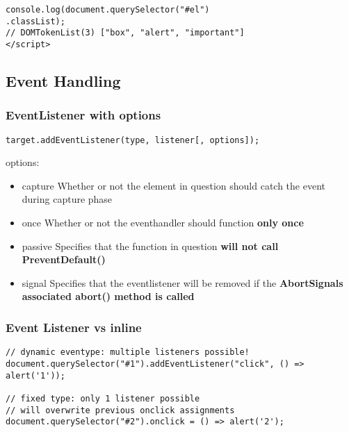 \documentclass[main.tex,fontsize=6pt,paper=a4,paper=landscape,DIV=calc,]{scrartcl}
\begin{document}
\begin{multicols*}{4}
\begin{lstlisting}
console.log(document.querySelector("#el")
.classList);
// DOMTokenList(3) ["box", "alert", "important"]
</script>
\end{lstlisting}
\vspace{2mm}


\subsection{Event Handling}

\subsubsection{EventListener with options}  
\vspace{-2mm}
\begin{lstlisting}
target.addEventListener(type, listener[, options]);
\end{lstlisting}
\vspace{2mm}
options:
\begin{itemize}
  \item capture \newline
    Whether or not the element in question should catch the event during capture phase
  \item once \newline
    Whether or not the eventhandler should function \textbf{only once}
  \item passive \newline
    Specifies that the function in question \textbf{will not call PreventDefault()}
  \item signal \newline 
    Specifies that the eventlistener will be removed if the \textbf{AbortSignals associated abort() method is called}
  
\end{itemize}

\subsubsection{Event Listener vs inline}  
\vspace{-2mm}
\begin{lstlisting}
// dynamic eventype: multiple listeners possible!
document.querySelector("#1").addEventListener("click", () => alert('1'));

// fixed type: only 1 listener possible
// will overwrite previous onclick assignments
document.querySelector("#2").onclick = () => alert('2');


\end{lstlisting}
\end{multicols*}
\end{document}
